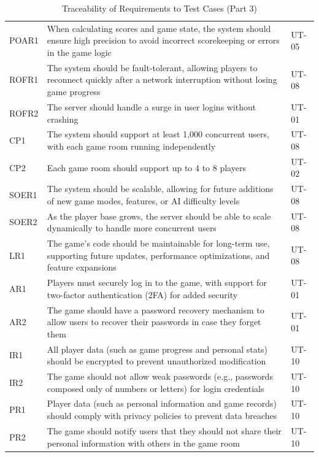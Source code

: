 \documentclass[12pt, titlepage]{article}
\begin{document}
\begin{table}[H]
    \centering
    \begin{tabularx}{\textwidth}{|l|X|l|}
        \hline
        POAR1 & When calculating scores and game state, the system should ensure high precision to avoid incorrect scorekeeping or errors in the game logic & UT-05 \\
        ROFR1 & The system should be fault-tolerant, allowing players to reconnect quickly after a network interruption without losing game progress & UT-08 \\
        ROFR2 & The server should handle a surge in user logins without crashing & UT-01 \\
        CP1 & The system should support at least 1,000 concurrent users, with each game room running independently & UT-08 \\
        CP2 & Each game room should support up to 4 to 8 players & UT-02 \\
        SOER1 & The system should be scalable, allowing for future additions of new game modes, features, or AI difficulty levels & UT-08 \\
        SOER2 & As the player base grows, the server should be able to scale dynamically to handle more concurrent users & UT-08 \\
        LR1 & The game’s code should be maintainable for long-term use, supporting future updates, performance optimizations, and feature expansions & UT-08 \\
        AR1 & Players must securely log in to the game, with support for two-factor authentication (2FA) for added security & UT-01 \\
        AR2 & The game should have a password recovery mechanism to allow users to recover their passwords in case they forget them & UT-01 \\
        IR1 & All player data (such as game progress and personal stats) should be encrypted to prevent unauthorized modification & UT-10 \\
        IR2 & The game should not allow weak passwords (e.g., passwords composed only of numbers or letters) for login credentials & UT-10 \\
        PR1 & Player data (such as personal information and game records) should comply with privacy policies to prevent data breaches & UT-10 \\
        PR2 & The game should notify users that they should not share their personal information with others in the game room & UT-10 \\
        \hline
    \end{tabularx}
    \caption{Traceability of Requirements to Test Cases (Part 3)}
    \label{tab:trace_requirements_3}
\end{table}
\end{document}

